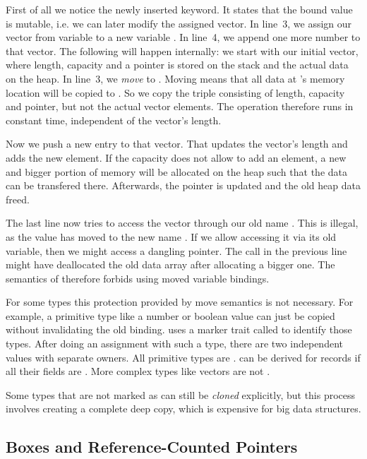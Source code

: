 First of all we notice the newly inserted  keyword.
It states that the bound value is mutable, i.e. we can later modify the assigned vector.
In line~3, we assign our vector from variable  to a new variable .
In line~4, we append one more number to that vector.
The following will happen internally: we start with our initial vector, where length, capacity and a pointer is stored on the stack and the actual data on the heap.
In line~3, we \emph{move}  to .
Moving means that all data at 's memory location will be copied to .
So we copy the triple consisting of length, capacity and pointer, but not the actual vector elements.
The operation therefore runs in constant time, independent of the vector's length.

Now we push a new entry to that vector.
That updates the vector's length and adds the new element.
If the capacity does not allow to add an element, a new and bigger portion of memory will be allocated on the heap such that the data can be transfered there.
Afterwards, the pointer is updated and the old heap data freed.

The last line now tries to access the vector through our old name .
This is illegal, as the value has moved to the new name .
If we allow accessing it via its old variable, then we might access a dangling pointer.
The  call in the previous line might have deallocated the old data array after allocating a bigger one.
The semantics of \rust therefore forbids using moved variable bindings.

For some types this protection provided by move semantics is not necessary.
For example, a primitive type like a number or boolean value can just be copied without invalidating the old binding.
\rust uses a marker trait called  to identify those types.
After doing an assignment with such a type, there are two independent values with separate owners.
All primitive types are .
 can be derived for records if all their fields are .
More complex types like vectors are not .

Some types that are not marked as  can still be \emph{cloned} explicitly, but this process involves creating a complete deep copy, which is expensive for big data structures.


\subsection{Boxes and Reference-Counted Pointers}

